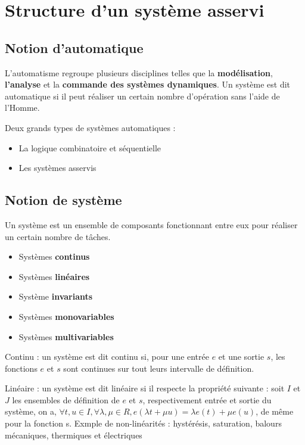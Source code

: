 \chapter{Structure d'un système asservi}
\section{Notion d'automatique}

L'automatisme regroupe plusieurs disciplines telles que la \textbf{modélisation}, \textbf{l'analyse} et la \textbf{commande des systèmes dynamiques}.
Un système est dit automatique si il peut réaliser un certain nombre d'opération sans l'aide de l'Homme. \newline

Deux grands types de systèmes automatiques :

\begin{itemize}
    \item La logique combinatoire et séquentielle
    \item Les systèmes asservis
\end{itemize}

\newpage
\section{Notion de système}

Un système est un ensemble de composants fonctionnant entre eux pour réaliser un certain nombre de tâches.
\begin{itemize}
    \item  Systèmes \textbf{continus}
    \item  Systèmes \textbf{linéaires}
    \item  Système \textbf{invariants}
    \item Systèmes \textbf{monovariables}
    \item Systèmes \textbf{multivariables}
\end{itemize}

Continu : un système est dit continu si, pour une entrée $e$ et une sortie $s$, les fonctions $e$ et $s$ sont continues sur tout leurs intervalle de définition. \newline

Linéaire : un système est dit linéaire si il respecte la propriété suivante : soit $I$ et $J$ les ensembles de définition de $e$ et $s$, respectivement entrée et sortie du système, on a, $\forall t,u \in I, \forall \lambda,\mu \in R, e(\lambda t + \mu u) = \lambda e(t) + \mu e(u)$, de même pour la fonction s.
Exmple de non-linéarités : hystérésis, saturation, balours mécaniques, thermiques et électriques\newline


